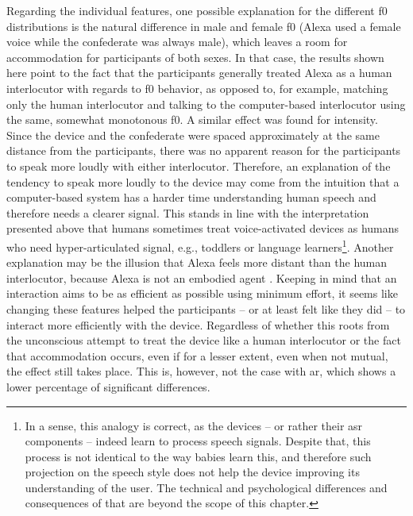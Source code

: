 Regarding the individual features, one possible explanation for the different \ac{f0} distributions is the natural difference in male and female \ac{f0} (Alexa used a female voice while the confederate was always male), which leaves a room for accommodation for participants of both sexes.
In that case, the results shown here point to the fact that the participants generally treated Alexa as a human interlocutor with regards to \ac{f0} behavior, as opposed to, for example, matching only the human interlocutor and talking to the computer-based interlocutor using the same, somewhat monotonous \ac{f0}.
A similar effect was found for intensity.
Since the device and the confederate were spaced approximately at the same distance from the participants, there was no apparent reason for the participants to speak more loudly with either interlocutor.
Therefore, an explanation of the tendency to speak more loudly to the device may come from the intuition that a computer-based system has a harder time understanding human speech and therefore needs a clearer signal.
This stands in line with the interpretation presented above that humans sometimes treat voice-activated devices as humans who need hyper-articulated signal, e.g., toddlers or language learners\footnote{In a sense, this analogy is correct, as the devices -- or rather their \ac{asr} components -- indeed learn to process speech signals.
Despite that, this process is not identical to the way babies learn this, and therefore such projection on the speech style does not help the device improving its understanding of the user.
The technical and psychological differences and consequences of that are beyond the scope of this chapter.}.
Another explanation may be the illusion that Alexa feels more distant than the human interlocutor, because Alexa is not an embodied agent \citep[cf.][and see \cref{sec:types_of_sdss} for further details]{Staum2010virtually, Gijssels2016speech}.
Keeping in mind that an interaction aims to be as efficient as possible using minimum effort, it seems like changing these features helped the participants -- or at least felt like they did -- to interact more efficiently with the device.
Regardless of whether this roots from the unconscious attempt to treat the device like a human interlocutor or the fact that accommodation occurs, even if for a lesser extent, even when not mutual, the effect still takes place.
This is, however, not the case with \ac{ar}, which shows a lower percentage of significant differences.
